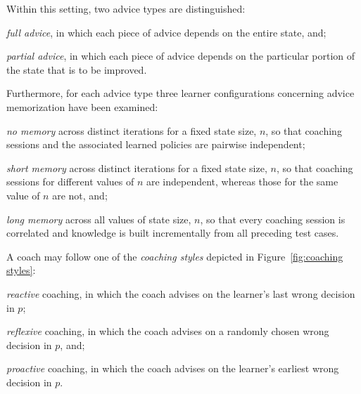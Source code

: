 \documentclass[runningheads]{llncs}
\begin{document}
Within this setting, two advice types are distinguished:
\begin{enumerate*}[label=(A\arabic*)]
	\item \emph{full advice}, in which each piece of advice depends on the entire state, and;
	\item \emph{partial advice}, in which each piece of advice depends on the particular portion of the state that is to be improved.
\end{enumerate*}
Furthermore, for each advice type three learner configurations concerning advice memorization have been examined:
\begin{enumerate*}[label=(M\arabic*)]
	\item \emph{no memory} across distinct iterations for a fixed state size, $n$, so that coaching sessions and the associated learned policies are pairwise independent;
	\item \emph{short memory} across distinct iterations for a fixed state size, $n$, so that coaching sessions for different values of $n$ are independent, whereas those for the same value of $n$ are not, and;
	\item \emph{long memory} across all values of state size, $n$, so that every coaching session is correlated and knowledge is built incrementally from all preceding test cases.
\end{enumerate*}
A coach may follow one of the \emph{coaching styles} depicted in Figure~\ref{fig:coaching styles}:
\begin{enumerate*}[label=(C\arabic*)]
	\item \emph{reactive} coaching, in which the coach advises on the learner's last wrong decision in $p$;
	\item \emph{reflexive} coaching, in which the coach advises on a randomly chosen wrong decision in $p$, and;
	\item \emph{proactive} coaching, in which the coach advises on the learner's earliest wrong decision in $p$.
\end{enumerate*}
\end{document}
